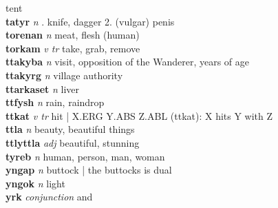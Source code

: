 tent\\\textbf{tatyr}   \emph{n} . knife, dagger 2. (vulgar) penis \\\textbf{torenan}   \emph{n} \textperiodcentered meat, flesh (human)\\\textbf{torkam}   \emph{v tr} \textperiodcentered take, grab, remove\\\textbf{ttakyba}   \emph{n} \textperiodcentered visit, opposition of the Wanderer, years of age\\\textbf{ttakyrg}   \emph{n} \textperiodcentered village authority\\\textbf{ttarkaset}   \emph{n} \textperiodcentered liver\\\textbf{ttfysh}   \emph{n} \textperiodcentered rain, raindrop\\\textbf{ttkat}   \emph{v tr} \textperiodcentered hit | X.ERG Y.ABS Z.ABL (ttkat): X hits Y with Z\\\textbf{ttla}   \emph{n} \textperiodcentered beauty, beautiful things\\\textbf{ttlyttla}   \emph{adj} \textperiodcentered beautiful, stunning\\\textbf{tyreb}   \emph{n} \textperiodcentered human, person, man, woman\\\textbf{yngap}   \emph{n} \textperiodcentered buttock | the buttocks is dual\\\textbf{yngok}   \emph{n} \textperiodcentered light\\\textbf{yrk}   \emph{conjunction} \textperiodcentered and\\